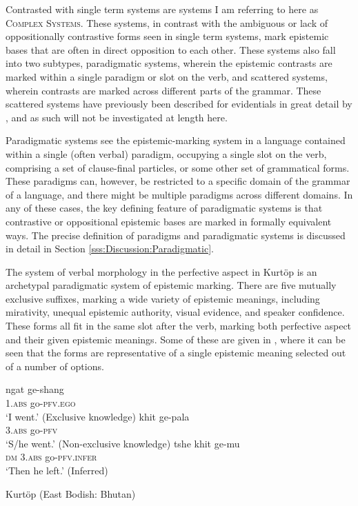 Contrasted with single term systems are systems I am referring to here as \textsc{Complex Systems}. These systems, in contrast with the ambiguous or lack of oppositionally contrastive forms seen in single term systems, mark epistemic bases that are often in direct opposition to each other. These systems also fall into two subtypes, paradigmatic systems, wherein the epistemic contrasts are marked within a single paradigm or slot on the verb, and scattered systems, wherein contrasts are marked across different parts of the grammar. These scattered systems have previously been described for evidentials in great detail by , and as such will not be investigated at length here.

Paradigmatic systems see the epistemic-marking system in a language contained within a single (often verbal) paradigm, occupying a single slot on the verb, comprising a set of clause-final particles, or some other set of grammatical forms. These paradigms can, however, be restricted to a specific domain of the grammar of a language, and there might be multiple paradigms across different domains. In any of these cases, the key defining feature of paradigmatic systems is that contrastive or oppositional epistemic bases are marked in formally equivalent ways. The precise definition of paradigms and paradigmatic systems is discussed in detail in Section \ref{sss:Discussion:Paradigmatic}.

The system of verbal morphology in the perfective aspect in Kurtöp \cite[East Bodish: Bhutan,][]{Hyslop2018} is an archetypal paradigmatic system of epistemic marking. There are five mutually exclusive suffixes, marking a wide variety of epistemic meanings, including mirativity, unequal epistemic authority, visual evidence, and speaker confidence. These forms all fit in the same slot after the verb, marking both perfective aspect and their given epistemic meanings. Some of these are given in , where it can be seen that the forms are representative of a single epistemic meaning selected out of a number of options.

\begin{exe}
        \ex\label{e:Description:KurtopPerfective}
        \begin{xlist}
                \ex 
                \gll ngat ge-shang \\
                1.\textsc{abs} go-\textsc{pfv.ego} \\
                \glt `I went.' (Exclusive knowledge) \cite[130]{Hyslop2018}
                \ex 
                \gll khit ge-pala \\
                3.\textsc{abs} go-\textsc{pfv} \\
                \glt `S/he went.' (Non-exclusive knowledge) \cite[130]{Hyslop2018}
                \ex 
                \gll tshe khit ge-mu \\
                \textsc{dm} 3.\textsc{abs} go-\textsc{pfv.infer} \\
                \glt `Then he left.' (Inferred) \cite[115]{Hyslop2014}
        \end{xlist}
        Kurtöp (East Bodish: Bhutan)
\end{exe}

